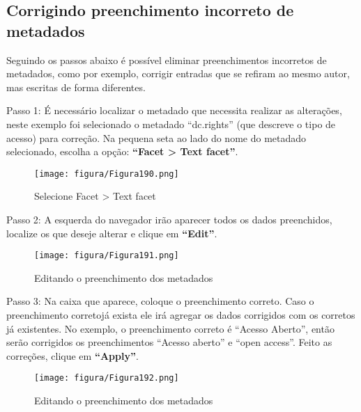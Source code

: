\documentclass[12pt,hidelinks]{article}
\begin{document}
    \subsection{Corrigindo preenchimento incorreto de metadados}
    
    Seguindo os passos abaixo é possível eliminar preenchimentos incorretos de metadados, como por exemplo, corrigir entradas que se refiram ao mesmo autor, mas escritas de forma diferentes.
    
    \singlespacing
    
    Passo 1: É necessário localizar o metadado que necessita realizar as alterações, neste exemplo foi selecionado o metadado “dc.rights” (que descreve o tipo de acesso) para correção. Na pequena seta ao lado do nome do metadado selecionado, escolha a opção: \textbf{“Facet > Text facet”}.
    
    \begin{figure}[!htp]
                \centering
                \texttt{[image: figura/Figura190.png]}
                \caption{Selecione Facet > Text facet}
            \label{Rotulo}
        \end{figure}
        
\newpage

    Passo 2: A esquerda do navegador irão aparecer todos os dados preenchidos, localize os que deseje alterar e clique em \textbf{“Edit”}.
    
    \begin{figure}[!htp]
                \centering
                \texttt{[image: figura/Figura191.png]}
                \caption{Editando o preenchimento dos metadados}
            \label{Rotulo}
        \end{figure}
    
    Passo 3: Na caixa que aparece, coloque o preenchimento correto. Caso o preenchimento corretojá exista ele irá agregar os dados corrigidos com os corretos já existentes. No exemplo, o preenchimento correto é “Acesso Aberto”, então serão corrigidos os preenchimentos “Acesso aberto” e “open access”. Feito as correções, clique em \textbf{“Apply”}.
    
    \begin{figure}[!htp]
                \centering
                \texttt{[image: figura/Figura192.png]}
                \caption{Editando o preenchimento dos metadados}
            \label{Rotulo}
        \end{figure}

\newpage
\end{document}
